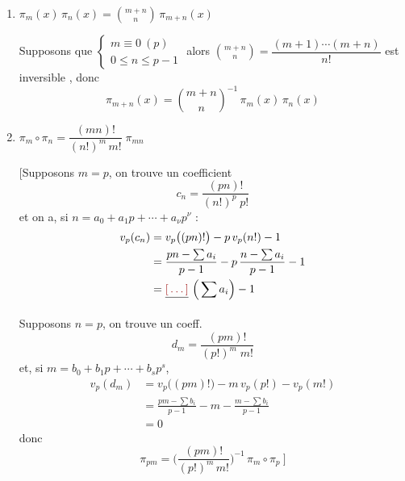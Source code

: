 \documentclass[11pt,a4paper]{article}
\begin{document}
\begin{enumerate}
  \item[a)] $\pi_{m}(x)\,\pi_{n}(x) = \binom{m+n}{n}\, \pi_{m+n}(x)$

  Supposons que $\begin{cases} m \equiv 0 \ (p) \\ 0 \leqslant n \leqslant p-1 \end{cases}$
  alors \struck{\ill{}} $\binom{m+n}{n} = \dfrac{(m+1)\cdots(m+n)}{n!}$
  \struck{\ill{}} est inversible , donc
  \[
    \boxed{\ \pi_{m+n}(x) = \binom{m+n}{n}^{-1}\, \pi_{m}(x)\,\pi_{n}(x)\ }
  \]

  \item[b)] $\pi_{m} \circ \pi_{n} = \dfrac{(mn)!}{(n!)^{m}\, m!}\; \pi_{mn}$

  [Supposons $m = p$, on trouve un coefficient
  \[
    c_{n} = \frac{(pn)!}{(n!)^{p}\; p!}
  \]
  et on a, si $n = a_{0} + a_{1} p + \cdots + a_{\nu} p^{\nu}$ :
  \begin{align*}
    v_{p}(c_{n}) &= v_{p}\big((pn)!\big) - p\, v_{p}(n!) - 1 \\
      &= \frac{pn - \sum a_{i}}{p-1} - p\,\frac{n - \sum a_{i}}{p-1} - 1 \\
      &= \struck{\ill{}}\ \Big(\sum a_{i}\Big) - 1
  \end{align*}

  Supposons $n = p$, on trouve un coeff.
  \[
    d_{m} = \frac{(pm)!}{(p!)^{m}\; m!}
  \]
  et, si $m = b_{0} + b_{1} p + \cdots + b_{s} p^{s}$,
  \begin{align*}
    v_{p}(d_{m}) &= v_{p}\big((pm)!\big) - m\, v_{p}(p!) - v_{p}(m!) \\
      &= \frac{pm - \sum b_{i}}{p-1} - m - \frac{m - \sum b_{i}}{p-1} \\
      &= 0
  \end{align*}
  donc
  \[
    \pi_{pm} = \Big(\frac{(pm)!}{(p!)^{m}\, m!}\Big)^{-1}\, \pi_{m} \circ \pi_{p}\ ]
  \]
\end{enumerate}
\end{document}
